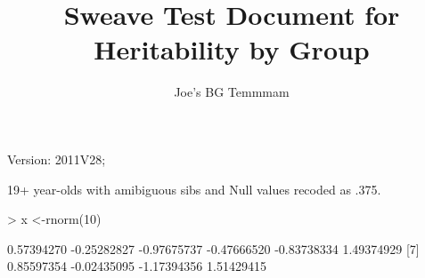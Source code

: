 \documentclass[a4paper]{article}
\title{Sweave Test Document for Heritability by Group}
\author{Joe's BG Temmmam}
\begin{document}
\maketitle
Version: 2011V28;


19+ year-olds with amibiguous sibs and Null values recoded as .375.

\begin{Schunk}
\begin{Sinput}
> x <-rnorm(10)
\end{Sinput}
\begin{Soutput}
 [1]  0.57394270 -0.25282827 -0.97675737 -0.47666520 -0.83738334  1.49374929
 [7]  0.85597354 -0.02435095 -1.17394356  1.51429415
\end{Soutput}
\end{Schunk}
\end{document}
